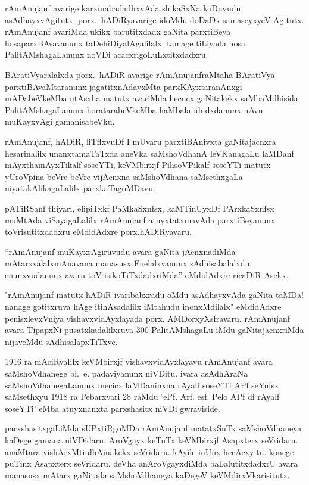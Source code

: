 rAmAnujanf avarige karxmabadadhxvAda shikaSxNa koDuvudu asAdhayxvAgitutx.
porx.~hADiRyavarige idoMdu doDaDx samaseyxyeV Agitutx. rAmAnujanf avariMda ukikx barutitxdadx gaNita parxtiBeya hosaparxBAvavanunx taDehiDiyalAgalilalx. tamage tiLiyada hosa PalitAMshagaLanunx noVDi acacxrigoLuLxtitxdadxru.
\vskip 0.1cm

BAratiVyaralalxda porx.~hADiR avarige rAmAnujanfraMtaha BAratiVya parxtiBA\-vaMtaranunx jagatitxnAdayxMta parxKAyxtaranAnxgi mADabeVkeMba utAsxha matutx avariMda hecucx gaNitakekx saMbaMdhisida PalitAMshagaLanunx horatarabeVkeMba haMbala idudxdanunx nAvu muKayxvAgi gamanisabeVku.
\vskip 0.1cm

rAmAnujanf, hADiR, liTflxvuDf I mUvaru parxtiBAnivxta gaNitajacnxra hesarinalilx unanxtamaTaTxda aneVka saMshoVdhanA leVKanagaLu laMDanf mAyxthamAyxTikalf soseYTi, keVMbirxjf PilisoVPikalf soseYTi matutx yUroVpina beVre beVre vijAcnxna saMshoV\-dhana saMsethxgaLa niyatakAlikagaLalilx parxkaTagoMDavu.
\vskip 0.1cm

pATiRSanf thiyari, elipiTxkf PaMkaSxnfsx, kaMTinUyxDf PArxkaSxnfsx muMtAda viSayagaLalilx rAmAnujanf atuyxtatxmavAda parxtiBeyanunx toVrisutitxdadxru eMdidAdxre porx.hADiRyavaru.
\vskip 0.1cm

``rAmAnujanf muKayxrAgiruvudu avara gaNita jAcnxnadiMda mAtarxvalalx\break mAnavana manasusx Enelalxvanunx sAdhisabalalxdu enunxvudanunx avaru toVrisikoTiTx\-dadxriMda'' eMdidAdxre ricaDfR Asekx.
\vskip 0.1cm

"rAmAnujanf matutx hADiR ivaribabxradu oMdu asAdhayxvAda gaNita taMDa! nanage gotitxruva hAge itihAsadalilx iMtahudu inonxMdilalx" eMdidAdxre penisxlevxVniya vishavxvidAyxlayada porx. AMDorxyXsfravaru. rAmAnujanf avara TipapxNi pusatxkadalilxruva {\rm 300} PalitAMshagaLu iMdu gaNitajacnxriMda nijaveMdu sAdhisalapxTiTxve.

{\rm 1916} ra mAciRyalilx keVMbirxjf vishavxvidAyxlayavu rAmAnujanf avara saMshoVdhanege bi.~e. padaviyanunx niVDitu. ivara asAdhAraNa saMshoVdhanegaLanunx mecicx laMDaninxna rAyalf soseYTi APf seYnfsx saMsethxyu {\rm 1918} ra Pebarxvari {\rm 28} raMdu `ePf. Arf. esf. Pelo APf di rAyalf soseYTi' eMba atuyxnanxta parxshasitx niVDi gwraviside.

parxshasitxgaLiMda sUPxtiRgoMDa rAmAnujanf matatxSuTx saMshoVdhaneya kaDege gamana niVDidaru. AroVgayx keTuTx keVMbirxjf Asapxterx seVridaru. anaMtara vishArxMti dhAmakekx seVridaru. kAyile inUnx hecAcxyitu. konege puTinx Asapxterx seVridaru. deVha anAroVgayxdiMda baLalutitxdadxrU avara manasusx mAtarx gaNitada saMshoVdhaneya kaDegeV keVMdirxVkarisitutx.

